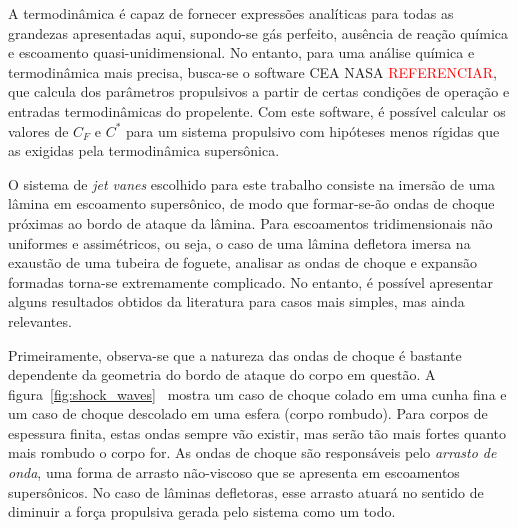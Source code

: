 A termodinâmica é capaz de fornecer expressões analíticas para todas as grandezas apresentadas aqui, supondo-se gás perfeito, ausência de reação química e escoamento quasi-unidimensional. No entanto, para uma análise química e termodinâmica mais precisa, busca-se o software CEA NASA \textcolor{red}{REFERENCIAR}, que calcula dos parâmetros propulsivos a partir de certas condições de operação e entradas termodinâmicas do propelente. Com este software, é possível calcular os valores de \(C_F\) e \(C^*\) para um sistema propulsivo com hipóteses menos rígidas que as exigidas pela termodinâmica supersônica. 

O sistema de \textit{jet vanes} escolhido para este trabalho consiste na imersão de uma lâmina em escoamento supersônico, de modo que formar-se-ão ondas de choque próximas ao bordo de ataque da lâmina. Para escoamentos tridimensionais não uniformes e assimétricos, ou seja, o caso de uma lâmina defletora imersa na exaustão de uma tubeira de foguete, analisar as ondas de choque e expansão formadas torna-se extremamente complicado. No entanto, é possível apresentar alguns resultados obtidos da literatura para casos mais simples, mas ainda relevantes. 

Primeiramente, observa-se que a natureza das ondas de choque é bastante dependente da geometria do bordo de ataque do corpo em questão. A figura~\ref{fig:shock_waves}~\cite{vandyke} mostra um caso de choque colado em uma cunha fina e um caso de choque descolado em uma esfera (corpo rombudo). Para corpos de espessura finita, estas ondas sempre vão existir, mas serão tão mais fortes quanto mais rombudo o corpo for. As ondas de choque são responsáveis pelo \textit{arrasto de onda}, uma forma de arrasto não-viscoso que se apresenta em escoamentos supersônicos. No caso de lâminas defletoras, esse arrasto atuará no sentido de diminuir a força propulsiva gerada pelo sistema como um todo.

